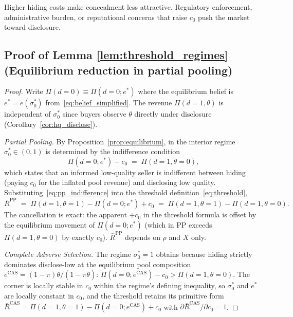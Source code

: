 \documentclass[10pt,letterpaper]{bp-template-concise}
\begin{document}
Higher hiding costs make concealment less attractive. Regulatory enforcement, administrative burden, or reputational concerns that raise $c_0$ push the market toward disclosure.

\subsection*{Proof of Lemma \ref{lem:threshold_regimes} (Equilibrium reduction in partial pooling)}

\begin{proof}
Write $\Pi(d=0)\equiv\Pi(d=0;e^*)$ where the equilibrium belief is $e^* = e(\sigma_0^*)$ from~\eqref{eq:belief_simplified}. The revenue $\Pi(d=1,\theta)$ is independent of $\sigma_0^*$ since buyers observe $\theta$ directly under disclosure (Corollary~\ref{cor:hq_disclose}).

\textit{Partial Pooling.} By Proposition~\ref{prop:equilibrium}, in the interior regime $\sigma_0^*\in(0,1)$ is determined by the indifference condition
\begin{equation}
    \Pi(d=0;e^*) - c_0 \;=\; \Pi(d=1,\theta=0),
    \label{eq:pp_indifference}
\end{equation}
which states that an informed low-quality seller is indifferent between hiding (paying $c_0$ for the inflated pool revenue) and disclosing low quality. Substituting~\eqref{eq:pp_indifference} into the threshold definition~\eqref{eq:threshold},
\begin{equation*}
    \bar R^{\text{PP}} \;=\; \Pi(d=1,\theta=1) - \Pi(d=0;e^*) + c_0 \;=\; \Pi(d=1,\theta=1) - \Pi(d=1,\theta=0).
\end{equation*}
The cancellation is exact: the apparent $+c_0$ in the threshold formula is offset by the equilibrium movement of $\Pi(d=0;e^*)$ (which in PP exceeds $\Pi(d=1,\theta=0)$ by exactly $c_0$). $\bar R^{\text{PP}}$ depends on $\rho$ and $X$ only.

\textit{Complete Adverse Selection.} The regime $\sigma_0^* = 1$ obtains because hiding strictly dominates disclose-low at the equilibrium pool composition $e^{\text{CAS}}=(1-\pi)\bar\theta/(1-\pi\bar\theta)$: $\Pi(d=0;e^{\text{CAS}}) - c_0 > \Pi(d=1,\theta=0)$. The corner is locally stable in $c_0$ within the regime's defining inequality, so $\sigma_0^*$ and $e^*$ are locally constant in $c_0$, and the threshold retains its primitive form $\bar R^{\text{CAS}} = \Pi(d=1,\theta=1) - \Pi(d=0;e^{\text{CAS}}) + c_0$ with $\partial \bar R^{\text{CAS}}/\partial c_0 = 1$.
\end{proof}
\end{document}
